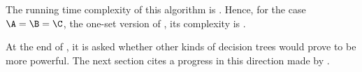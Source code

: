 The running time complexity of this algorithm is
\BigO{\card{\C}(\card{\A}+\card{\B})}. Hence, for the case $\A = \B =
\C$, \ie the one-set version of \threeSUM, its complexity is .

At the end of \cite{erickson:1999}, it is asked whether other kinds of
decision trees would prove to be more powerful. The next section cites a
progress in this direction made by \citet*{ailon:2005}.
